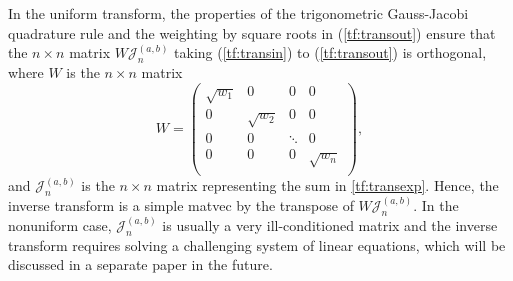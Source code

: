 \documentclass[11pt]{article}
\begin{document}
In the uniform transform, the properties of the trigonometric Gauss-Jacobi quadrature rule and the
weighting by square roots in (\ref{tf:transout}) ensure that the
$n \times n$ matrix $W \mathcal{J}_n^{(a,b)}$
taking (\ref{tf:transin}) to (\ref{tf:transout}) is orthogonal, where $W$ is the $n\times n$ matrix
\begin{equation}
W = \left(
\begin{array}{cccc}
\sqrt{w_1} & 0          & 0      & 0           \\
0          & \sqrt{w_2} & 0      & 0           \\
0          & 0          & \ddots & 0           \\
0          & 0          & 0      & \sqrt{w_n} \\
\end{array}
\right),
\end{equation}
and $\mathcal{J}_n^{(a,b)}$ is the $n \times n$ matrix representing the sum in \eqref{tf:transexp}. Hence, the inverse transform is a simple matvec by the transpose of $W\mathcal{J}_n^{(a,b)}$. In the nonuniform case, $\mathcal{J}_n^{(a,b)}$ is usually a very ill-conditioned matrix and the inverse transform requires solving a challenging system of linear equations, which will be discussed in a separate paper in the future. 
\end{document}
